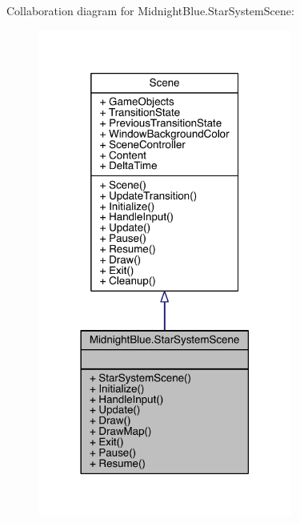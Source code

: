 Collaboration diagram for Midnight\+Blue.\+Star\+System\+Scene\+:\nopagebreak
\begin{figure}[H]
\begin{center}
\leavevmode
\includegraphics[width=237pt]{class_midnight_blue_1_1_star_system_scene__coll__graph}
\end{center}
\end{figure}
